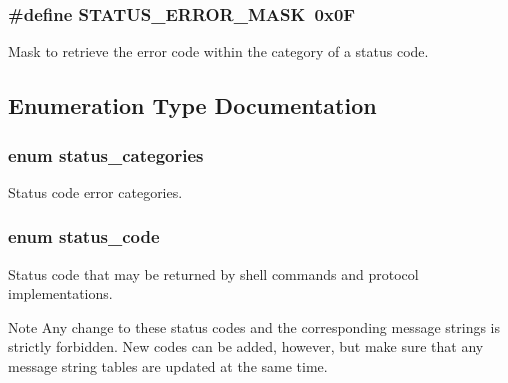 \subsubsection[{S\+T\+A\+T\+U\+S\+\_\+\+E\+R\+R\+O\+R\+\_\+\+M\+A\+S\+K}]{\setlength{\rightskip}{0pt plus 5cm}\#define S\+T\+A\+T\+U\+S\+\_\+\+E\+R\+R\+O\+R\+\_\+\+M\+A\+S\+K~0x0\+F}\label{group__group__sam0__utils__status__codes_ga4c46d8f176ca46ab775db0fe270d2f98}
Mask to retrieve the error code within the category of a status code. 

\subsection{Enumeration Type Documentation}
\hypertarget{group__group__sam0__utils__status__codes_ga477539e8a67b0cab096e8ecda6f5d7d6}{}
\subsubsection[{status\+\_\+categories}]{\setlength{\rightskip}{0pt plus 5cm}enum {\bf status\+\_\+categories}}\label{group__group__sam0__utils__status__codes_ga477539e8a67b0cab096e8ecda6f5d7d6}
Status code error categories. \hypertarget{group__group__sam0__utils__status__codes_ga751c892e5a46b8e7d282085a5a5bf151}{}
\subsubsection[{status\+\_\+code}]{\setlength{\rightskip}{0pt plus 5cm}enum {\bf status\+\_\+code}}\label{group__group__sam0__utils__status__codes_ga751c892e5a46b8e7d282085a5a5bf151}
Status code that may be returned by shell commands and protocol implementations.

\begin{DoxyNote}{Note}
Any change to these status codes and the corresponding message strings is strictly forbidden. New codes can be added, however, but make sure that any message string tables are updated at the same time. 
\end{DoxyNote}
\hypertarget{group__group__sam0__utils__status__codes_ga29235ed38b6f02861f29daae665ac3a2}{}
